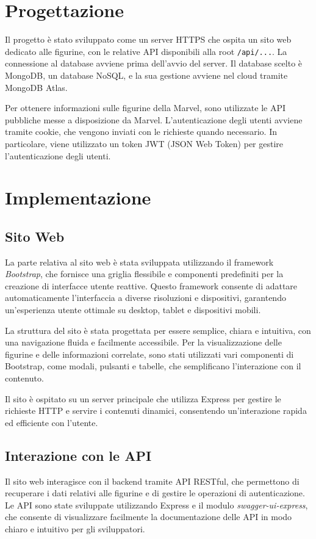 \documentclass{article}
\begin{document}
\section{Progettazione}
Il progetto è stato sviluppato come un server HTTPS che ospita un sito web dedicato alle figurine, con le relative API disponibili alla root \texttt{/api/...}. La connessione al database avviene prima dell'avvio del server. Il database scelto è MongoDB, un database NoSQL, e la sua gestione avviene nel cloud tramite MongoDB Atlas.

Per ottenere informazioni sulle figurine della Marvel, sono utilizzate le API pubbliche messe a disposizione da Marvel. L'autenticazione degli utenti avviene tramite cookie, che vengono inviati con le richieste quando necessario. In particolare, viene utilizzato un token JWT (JSON Web Token) per gestire l'autenticazione degli utenti.

    
\section*{Implementazione}

    \subsection*{Sito Web}
    La parte relativa al sito web è stata sviluppata utilizzando il framework \textit{Bootstrap}, che fornisce una griglia flessibile e componenti predefiniti per la creazione di interfacce utente reattive. Questo framework consente di adattare automaticamente l'interfaccia a diverse risoluzioni e dispositivi, garantendo un'esperienza utente ottimale su desktop, tablet e dispositivi mobili. 
    
    La struttura del sito è stata progettata per essere semplice, chiara e intuitiva, con una navigazione fluida e facilmente accessibile. Per la visualizzazione delle figurine e delle informazioni correlate, sono stati utilizzati vari componenti di Bootstrap, come modali, pulsanti e tabelle, che semplificano l'interazione con il contenuto.
    
    Il sito è ospitato su un server principale che utilizza Express per gestire le richieste HTTP e servire i contenuti dinamici, consentendo un'interazione rapida ed efficiente con l'utente.
    
    \subsection*{Interazione con le API}
    Il sito web interagisce con il backend tramite API RESTful, che permettono di recuperare i dati relativi alle figurine e di gestire le operazioni di autenticazione. Le API sono state sviluppate utilizzando Express e il modulo \textit{swagger-ui-express}, che consente di visualizzare facilmente la documentazione delle API in modo chiaro e intuitivo per gli sviluppatori.
    
\end{document}
